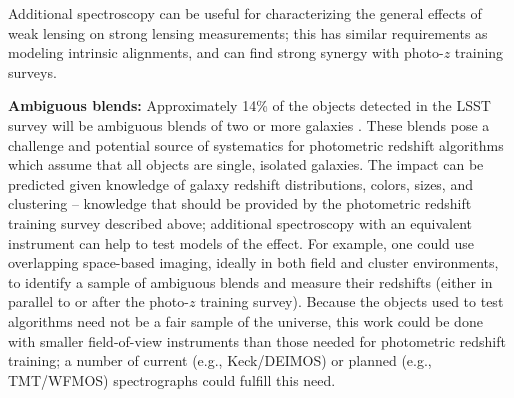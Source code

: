 Additional spectroscopy can be useful for characterizing the general effects of weak lensing on  strong lensing measurements; this has similar
requirements as modeling intrinsic alignments, and can find strong
synergy with photo-$z$ training surveys.

%


{\bf Ambiguous blends:}
Approximately 14\% of the objects detected in the LSST survey will be ambiguous blends of two or more galaxies \citep{Dawson}. These  blends pose a challenge and potential source of systematics for photometric redshift algorithms which assume that all objects are single, isolated galaxies.
The impact can be predicted given knowledge of galaxy redshift distributions, colors, sizes, and clustering -- knowledge that should be provided by the photometric redshift training survey described above; additional spectroscopy with an equivalent instrument can help to test models of the effect.  For example, one could use overlapping space-based imaging, ideally in both field and cluster environments, to identify a sample of ambiguous blends and measure their redshifts (either in parallel to or after the photo-$z$ training survey).  Because the objects used to test algorithms need not be a fair sample of the universe, this work could be done with smaller field-of-view instruments than those needed for photometric redshift training; a number of current (e.g., Keck/DEIMOS) or planned (e.g., TMT/WFMOS) spectrographs could fulfill this need.

